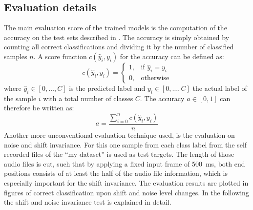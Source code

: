 \subsection{Evaluation details}\label{sec:exp_details_tb}
The main evaluation score of the trained models is the computation of the accuracy on the test sets described in .
The accuracy is simply obtained by counting all correct classifications and dividing it by the number of classified samples $n$.
A score function $c(\hat{y}_i, y_i)$ for the accuracy can be defined as:
\begin{equation}
  c(\hat{y}_i, y_i) = 
  \begin{cases}
    1, & \text{if } \hat{y}_i = y_i\\
    0, & \text{otherwise} 
  \end{cases}
\end{equation}
where $\hat{y}_i \in [0, \dots, C]$ is the predicted label and $y_i \in [0, \dots, C]$ the actual label of the sample $i$ with a total number of classes $C$.
The accuracy $a \in [0, 1]$ can therefore be written as:
\begin{equation}
  a = \frac{\sum_{i=0}^n c(\hat{y}_i, y_i)}{n}
\end{equation}
Another more unconventional evaluation technique used, is the evaluation on noise and shift invariance.
For this one sample from each class label from the self recorded files of the \enquote{my dataset} is used as test targets.
The length of those audio files is cut, such that by applying a fixed input frame of \SI{500}{\milli\second}, both end positions consists of at least the half of the audio file information, which is especially important for the shift invariance.
The evaluation results are plotted in figures of correct classification upon shift and noise level changes.
In the following the shift and noise invariance test is explained in detail.


